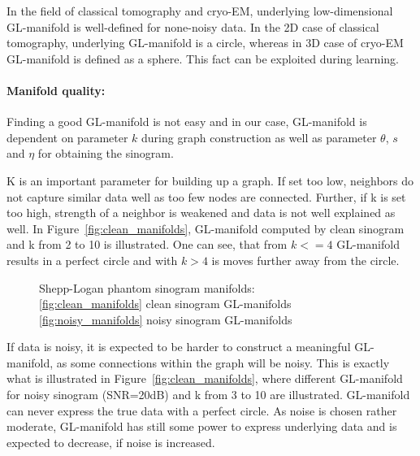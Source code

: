 \begin{tcolorbox}[colback=red!5!white,colframe=red!75!black]
    In the field of classical tomography and cryo-EM, underlying low-dimensional GL-manifold is well-defined for none-noisy data.
    In the 2D case of classical tomography, underlying GL-manifold is a circle, whereas in 3D case of cryo-EM  GL-manifold
    is defined as a sphere.
    This fact can be exploited during learning.
\end{tcolorbox}

\paragraph{Manifold quality:}

Finding a good GL-manifold is not easy and in our case, GL-manifold is dependent on parameter $k$ during graph construction
as well as parameter $\theta$, $s$ and $\eta$ for obtaining the sinogram.

K is an important parameter for building up a graph. If set too low, neighbors
do not capture similar data well as too few nodes are connected. 
Further, if k is set too high, strength of a neighbor 
is weakened and data is not well explained as well.
In Figure~\ref{fig:clean_manifolds}, GL-manifold computed by clean sinogram and k from 2 to 10 is illustrated.
One can see, that from $k <= 4$ GL-manifold results in a perfect circle and with $k >  4$ is moves 
further away from the circle. 


\begin{figure}[H]
    \centering
    \hfill
    \hfill
    \hfill
    \caption{Shepp-Logan phantom sinogram manifolds: \\
    \ref{fig:clean_manifolds} clean sinogram GL-manifolds \\
    \ref{fig:noisy_manifolds} noisy sinogram GL-manifolds}
\end{figure}

If data is noisy, it is expected to be harder to construct a meaningful GL-manifold, as some connections within
the graph will be noisy. This is exactly what is illustrated in Figure~\ref{fig:clean_manifolds}, where 
different GL-manifold for noisy sinogram (SNR=20dB) and k from 3 to 10 are illustrated.
GL-manifold can never express the true data with a perfect circle. As noise is chosen rather moderate, GL-manifold has still some 
power to express underlying data and is expected to decrease, if noise is increased.


